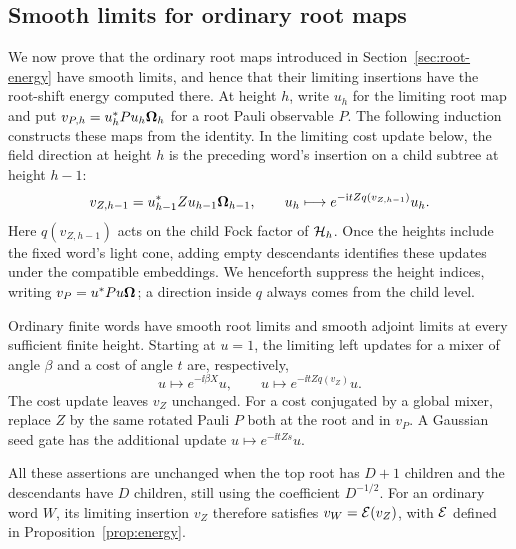 \subsection{Smooth limits for ordinary root maps}
\label{sec:ordinary-root-calculus}

We now prove that the ordinary root maps introduced in
Section~\ref{sec:root-energy} have smooth limits, and hence that their
limiting insertions have the root-shift energy computed there.
At height $h$, write $u_h$ for the limiting root map and put
$v_{P,h}=u_h^*Pu_h\boldsymbol\Omega_h$ for a root Pauli observable $P$.
The following induction constructs these maps from the identity.
In the limiting cost update below, the field direction at height $h$ is the
preceding word's insertion on a child subtree at height $h-1$:
\[
 v_{Z,h-1}=u_{h-1}^*Zu_{h-1}\boldsymbol\Omega_{h-1},\qquad
 u_h\longmapsto e^{-\mathrm i tZq(v_{Z,h-1})}u_h.
\]
Here $q(v_{Z,h-1})$ acts on the child Fock factor of $\mathcal H_h$.
Once the heights include the fixed word's light cone, adding empty
descendants identifies these updates under the compatible embeddings.
We henceforth suppress the height indices, writing $v_P=u^*Pu\boldsymbol\Omega$;
a direction inside $q$ always comes from the child level.

\begin{lemma}\label{lem:ordinary-updates}
Ordinary finite words have smooth root limits and smooth adjoint
limits at every sufficient finite height.  Starting at $u=1$,
the limiting left updates for a mixer of angle $\beta$ and a cost of angle $t$
are, respectively,
\begin{equation}\label{eq:ordinary-root-updates}
 u\longmapsto e^{-\ii\beta X}u,
 \qquad
 u\longmapsto e^{-\ii tZq(v_Z)}u.
\end{equation}
The cost update leaves $v_Z$ unchanged.  For a cost conjugated
by a global mixer, replace $Z$ by the same rotated Pauli $P$
both at the root and in $v_P$.  A Gaussian seed gate has the
additional update $u\mapsto e^{-\ii tZs}u$.

All these assertions are unchanged when the top root has $D+1$
children and the descendants have $D$ children, still using
the coefficient $D^{-1/2}$. For an ordinary word $W$, its limiting
insertion $v_Z$ therefore satisfies $v_W=\mathcal E(v_Z)$, with
$\mathcal E$ defined in Proposition~\ref{prop:energy}.
\end{lemma}

